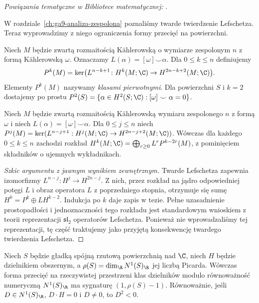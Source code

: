 \noindent\emph{Powiązania tematyczne w Bibliotece matematycznej:} .


W rozdziale~\ref{ch:ga9-analiza-zespolona} poznaliśmy
twarde twierdzenie Lefschetza. Teraz wyprowadzimy z niego
ograniczenia formy przecięć na powierzchni.

\begin{definicja}
Niech $M$ będzie zwartą rozmaitością Kählerowską
o wymiarze zespolonym $n$ z formą Kählerowską $\omega$.
Oznaczamy $L(\alpha)=[\omega]\smile\alpha$.
Dla $0\le k\le n$ definiujemy
\[
 P^k(M)=\ker\bigl(L^{n-k+1}\colon
 H^k(M;\C)\to H^{2n-k+2}(M;\C)\bigr).
\]
Elementy $P^k(M)$ nazywamy \emph{klasami pierwotnymi}.
Dla powierzchni $S$ i $k=2$ dostajemy po prostu
$P^2(S)=\{\alpha\in H^2(S;\C):[\omega]\smile\alpha=0\}$.
\end{definicja}

\begin{twierdzenie}
Niech $M$ będzie zwartą rozmaitością Kählerowską wymiaru
zespolonego $n$ z formą $\omega$ i niech
$L(\alpha)=[\omega]\smile\alpha$. Dla $0\le j\le n$
niech $P^j(M)=\ker(L^{n-j+1}:H^j(M;\C)\to
H^{2n-j+2}(M;\C))$. Wówczas dla każdego $0\le k\le n$
zachodzi rozkład
$H^k(M;\C)=\bigoplus_{r\ge0}L^rP^{k-2r}(M)$,
z pominięciem składników o ujemnych wykładnikach.
\end{twierdzenie}
\begin{proof}[Szkic argumentu z jawnym wynikiem zewnętrznym]
Twarde Lefschetza zapewnia izomorfizmy
$L^{n-j}\colon H^j\to H^{2n-j}$.
Z nich, przez rozkład na jądro odpowiedniej potęgi $L$
i obraz operatora $L$ z poprzedniego stopnia,
otrzymuje się sumę $H^k=P^k\oplus LH^{k-2}$.
Indukcja po $k$ daje zapis w tezie. Pełne uzasadnienie
prostopadłości i jednoznaczności tego rozkładu jest
standardowym wnioskiem z teorii reprezentacji $\mathfrak{sl}_2$
operatorów Lefschetza. Ponieważ nie wprowadzaliśmy tej
reprezentacji, tę część traktujemy jako przyjętą
konsekwencję twardego twierdzenia Lefschetza.
\end{proof}

\begin{twierdzenie}
\label{tw:ga10-index}
Niech $S$ będzie gładką spójną rzutową powierzchnią
nad $\C$, niech $H$ będzie dzielnikiem obszernym, a
$\rho(S)=\dim_{\R}N^1(S)_{\R}$ jej liczbą Picarda.
Wówczas forma przecięć na rzeczywistej przestrzeni klas
dzielników modulo równoważność numeryczną
$N^1(S)_{\R}$ ma sygnaturę $(1,\rho(S)-1)$.
Równoważnie, jeśli $D\in N^1(S)_{\R}$,
$D\cdot H=0$ i $D\ne0$, to $D^2<0$.
\end{twierdzenie}

